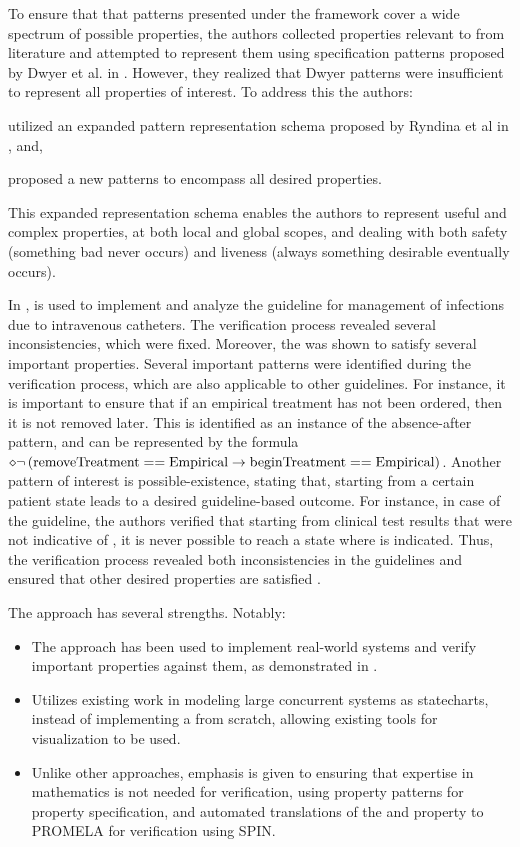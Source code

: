 To ensure that that patterns presented under the \MDA{} framework
cover a wide spectrum of possible properties, the authors
collected properties relevant to \BPGs{} from literature and attempted
to represent them using specification patterns proposed by Dwyer et al.
in \cite{DwyerFM98}. However, they realized that Dwyer patterns
were insufficient to represent all properties of interest. To
address this the authors:
\begin{enumerate*}[label=(\alph*)]
  \item utilized an expanded pattern representation schema
    proposed by Ryndina et al in \cite{RyndinaThesis05}, and,
  \item proposed a new patterns to encompass all desired properties.
\end{enumerate*}
This expanded representation schema enables the authors to represent
useful and complex properties, at both local and global scopes, and
dealing with both safety (something bad never occurs) and liveness
(always something desirable eventually occurs).

In \cite{PorresECBS08}, \MDA{}
is used to implement and analyze the
\IRC{} guideline for management of infections due
to intravenous catheters. The verification process revealed
several inconsistencies, which were fixed. Moreover, the \CDSS{}
was shown to satisfy several important properties. Several
important patterns were identified during the verification process,
which are also applicable to other guidelines. For instance,
it is important to ensure
that if an empirical treatment has not been ordered, then
it is not removed later. This is identified as
an instance of the absence-after pattern, and can
be represented by the \LTL{} formula
$\diamond\neg\left(\text{removeTreatment} == \text{Empirical} \to
\text{beginTreatment} == \text{Empirical}\right)$.
Another pattern of interest is possible-existence, stating that,
starting from a certain patient
state leads to a desired guideline-based outcome. For instance,
in case of the \IRC{} guideline, the authors verified that
starting from clinical test results that were not indicative of
\IRC{}, it is never possible to reach a state where \IRC{} is indicated.
Thus, the verification process revealed both inconsistencies in the guidelines
and ensured that other desired properties are satisfied \cite{PerezJBI10}.

The \MDA{} approach has several strengths. Notably:
\begin{itemize}
  \item The approach has been used to implement real-world
    systems and verify important properties against them,
    as demonstrated in \cite{PorresECBS08}.
  \item Utilizes existing work in modeling large concurrent
    systems as statecharts, instead of implementing a \DSL{} from
    scratch, allowing existing tools for visualization to be used.
  \item Unlike other approaches, emphasis is given to ensuring
    that expertise in mathematics is not needed for verification,
    using property patterns for property specification,
    and automated translations of the \BPG{} and property to PROMELA
    for verification using SPIN.
\end{itemize}

